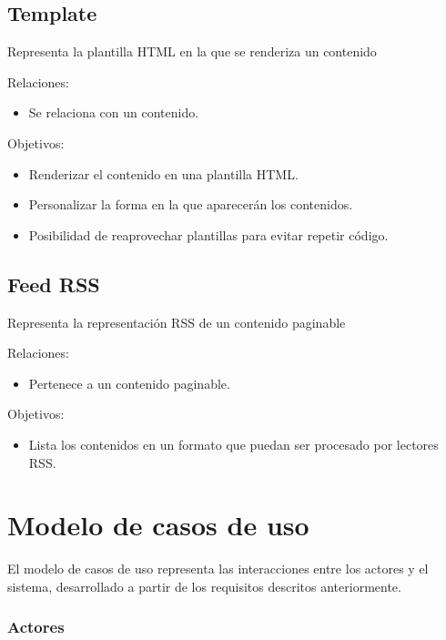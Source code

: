 \subsection{Template}

Representa la plantilla HTML en la que se renderiza un contenido

Relaciones:
\begin{itemize}
    \item Se relaciona con un contenido.
\end{itemize}

Objetivos:
\begin{itemize}
    \item Renderizar el contenido en una plantilla HTML.
    \item Personalizar la forma en la que aparecerán los contenidos.
    \item Posibilidad de reaprovechar plantillas para evitar repetir código.
\end{itemize}

\subsection{Feed RSS}

Representa la representación RSS de un contenido paginable

Relaciones:
\begin{itemize}
    \item Pertenece a un contenido paginable.
\end{itemize}

Objetivos:
\begin{itemize}
    \item Lista los contenidos en un formato que puedan ser procesado por lectores RSS.
\end{itemize}


\section{Modelo de casos de uso}

El modelo de casos de uso representa las interacciones entre los actores y el sistema, 
desarrollado a partir de los requisitos descritos anteriormente.

\subsubsection{Actores}

